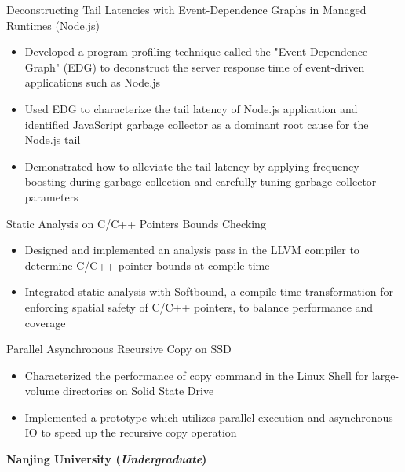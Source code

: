 \documentclass[margin, 9pt]{res} %
\begin{document}
\begin{resume}
\medskip
\vspace*{-7pt}
Deconstructing Tail Latencies with Event-Dependence Graphs in Managed Runtimes (Node.js)\\
\vspace*{-10pt}
\begin{itemize}[leftmargin=*] \itemsep -3pt
\vspace*{-5pt}
	\item Developed a program profiling technique called the "Event Dependence Graph" (EDG) to deconstruct the server response time of event-driven applications such as Node.js
	\item Used EDG to characterize the tail latency of Node.js application and identified JavaScript garbage collector as a dominant root cause for the Node.js tail
	\item Demonstrated how to alleviate the tail latency by applying frequency boosting during garbage collection and carefully tuning garbage collector parameters
\end{itemize}

\medskip
Static Analysis on C/C++ Pointers Bounds Checking\\
\vspace*{-10pt}
\begin{itemize}[leftmargin=*] \itemsep -3pt
\vspace*{-5pt}
	\item Designed and implemented an analysis pass in the LLVM compiler to determine C/C++ pointer bounds at compile time
	\item Integrated static analysis with Softbound, a compile-time transformation for enforcing spatial safety of C/C++ pointers, to balance performance and coverage
\end{itemize}

\medskip
Parallel Asynchronous Recursive Copy on SSD\\
\vspace*{-10pt}
\begin{itemize}[leftmargin=*] \itemsep -3pt
\vspace*{-5pt}
	\item Characterized the performance of copy command in the Linux Shell for large-volume directories on Solid State Drive
	\item Implemented a prototype which utilizes parallel execution and asynchronous IO to speed up the recursive copy operation
\end{itemize}

\bigskip
{\large\textbf{Nanjing University (\textit{Undergraduate})}}\\


\end{resume}
\end{document}
